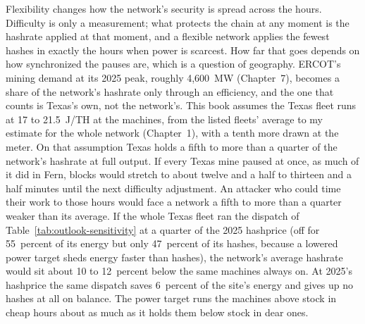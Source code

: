 Flexibility changes how the network's security is spread across the hours. Difficulty is only a measurement; what protects the chain at any moment is the hashrate applied at that moment, and a flexible network applies the fewest hashes in exactly the hours when power is scarcest. How far that goes depends on how synchronized the pauses are, which is a question of geography. ERCOT's mining demand at its 2025 peak, roughly 4,600~MW (Chapter~7), becomes a share of the network's hashrate only through an efficiency, and the one that counts is Texas's own, not the network's. This book assumes the Texas fleet runs at 17 to 21.5~J/TH at the machines, from the listed fleets' average to my estimate for the whole network (Chapter~1), with a tenth more drawn at the meter. On that assumption Texas holds a fifth to more than a quarter of the network's hashrate at full output. If every Texas mine paused at once, as much of it did in Fern, blocks would stretch to about twelve and a half to thirteen and a half minutes until the next difficulty adjustment. An attacker who could time their work to those hours would face a network a fifth to more than a quarter weaker than its average. If the whole Texas fleet ran the dispatch of Table~\ref{tab:outlook-sensitivity} at a quarter of the 2025 hashprice (off for 55~percent of its energy but only 47~percent of its hashes, because a lowered power target sheds energy faster than hashes), the network's average hashrate would sit about 10 to 12~percent below the same machines always on. At 2025's hashprice the same dispatch saves 6~percent of the site's energy and gives up no hashes at all on balance. The power target runs the machines above stock in cheap hours about as much as it holds them below stock in dear ones. %
